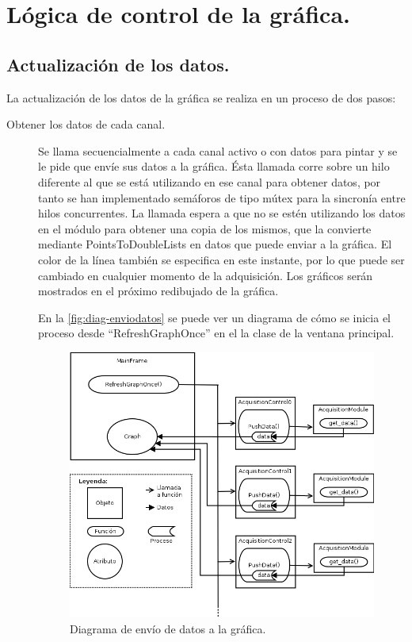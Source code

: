 	\section{Lógica de control de la gráfica.}
	
	

		
	\subsection{Actualización de los datos.}\label{subsec:act_datos}
	La actualización de los datos de la gráfica se realiza en un proceso de dos pasos:
	\begin{description}
		\item[Obtener los datos de cada canal.] Se llama secuencialmente a cada canal activo o con datos para pintar y se le pide que envíe sus datos a la gráfica. Ésta llamada corre sobre un hilo diferente al que se está utilizando en ese canal para obtener datos, por tanto se han implementado semáforos de tipo mútex para la sincronía entre hilos concurrentes. La llamada espera a que no se estén utilizando los datos en el módulo para obtener una copia de los mismos, que la convierte mediante PointsToDoubleLists en datos que puede enviar a la gráfica. El color de la línea también se especifica en este instante, por lo que puede ser cambiado en cualquier momento de la adquisición. Los gráficos serán mostrados en el próximo redibujado de la gráfica.
		

		En la \autoref{fig:diag-enviodatos} se puede ver un diagrama de cómo se inicia el proceso desde ``RefreshGraphOnce'' en el la clase de la ventana principal.
		
					\begin{figure}[H]
		  \centering
		  \includegraphics[width=1\textwidth]{img/graph-refresh_diagram.png}
		  \caption{Diagrama de envío de datos a la gráfica.}\label{fig:diag-enviodatos}
		\end{figure}
		

\end{description}
